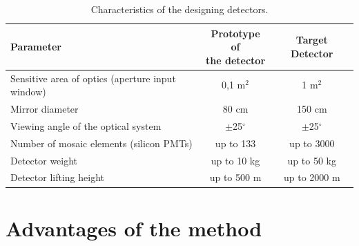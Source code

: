 \documentclass[a4paper]{jpconf}
\begin{document}
\begin{table}[tb]
\centering
\caption{Characteristics of the designing detectors.}
\label{tab:statistics}
\vspace{1pc}
\begin{tabular}{| l |c|c|}
\hline
\textbf{Parameter}  & \parbox[t][.8cm]{3cm}{\textbf{Prototype of\\the detector}} & \textbf{Target Detector} \\ [1.5ex]
\hline
Sensitive area of optics (aperture input window) & 0,1 m$^2$ &  1 m$^2$\\ 
\hline
Mirror diameter & 80 cm &  150 cm\\
\hline
Viewing angle of the optical system & $\pm$25$^\circ$ & $\pm$25$^\circ$ \\
\hline
Number of mosaic elements (silicon PMTs) & up to 133 & up to 3000 \\
\hline
Detector weight & up to 10 kg & up to 50 kg \\
\hline
Detector lifting height & up to 500 m & up to 2000 m \\
\hline
\end{tabular}
\end{table}


\section{Advantages of the method}
\end{document}

